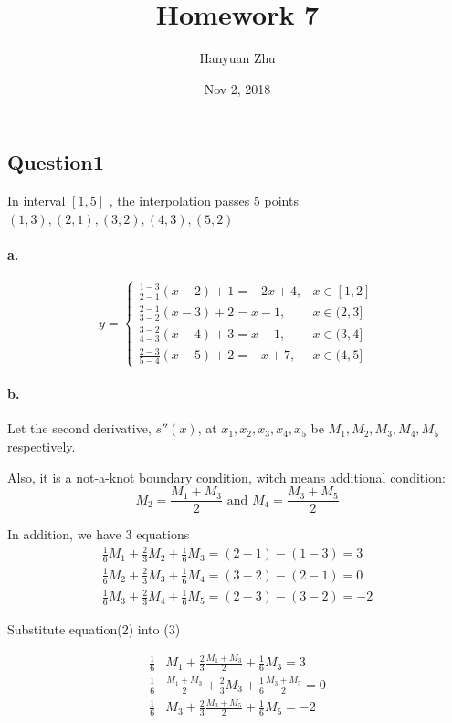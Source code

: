 \documentclass{article}
\title{Homework 7}
\author{Hanyuan Zhu}
\date{Nov 2, 2018}
\begin{document}
\maketitle

\subsection*{Question1}

In interval $[1 , 5]$ , the interpolation passes 5 points $(1,3), (2,1),(3,2),(4,3),(5,2)$
\paragraph{a.}
\begin{equation}
  y =
  \begin{cases}
\frac{1-3}{2-1}(x-2) + 1 = -2 x + 4, & x \in [1,2]\\
\frac{2-1}{3-2}(x-3) + 2 = x - 1, & x \in (2,3]\\
\frac{3-2}{4-3}(x-4) + 3 = x - 1, & x \in (3,4]\\
\frac{2-3}{5-4}(x-5) + 2 = - x + 7, & x \in (4,5]
  \end{cases}
\end{equation}

\paragraph{b.}
Let the second derivative, $s''(x)$, at  $ x_1,x_2,x_3,x_4,x_5 $ be $M_1,M_2,M_3,M_4,M_5$ respectively.

Also, it is a not-a-knot boundary condition, witch means additional condition:
\begin{equation}
  M_2 = \frac{M_1+M_3}{2} \text{ and }  M_4 = \frac{M_3+M_5}{2}
\end{equation}

In addition, we have 3 equations
\begin{equation}
  \begin{split}
    \frac{1}{6} M_1 + \frac{2}{3}M_2 + \frac{1}{6} M_3 = (2-1) - (1 - 3) = 3\\
    \frac{1}{6} M_2 + \frac{2}{3}M_3 + \frac{1}{6} M_4 = (3-2) - (2 - 1) = 0\\
    \frac{1}{6} M_3 + \frac{2}{3}M_4 + \frac{1}{6} M_5 = (2-3) - (3 - 2) = -2
  \end{split}
\end{equation}

Substitute equation(2) into (3)

\begin{equation}
  \begin{split}
    \frac{1}{6} &M_1 + \frac{2}{3}\frac{M_1+M_3}{2} + \frac{1}{6} M_3 = 3\\
    \frac{1}{6} &\frac{M_1+M_3}{2}+ \frac{2}{3}M_3 + \frac{1}{6}\frac{M_3+M_5}{2}=0\\
    \frac{1}{6} &M_3 + \frac{2}{3} \frac{M_3+M_5}{2} + \frac{1}{6} M_5 = -2
  \end{split}
\end{equation}
\end{document}
